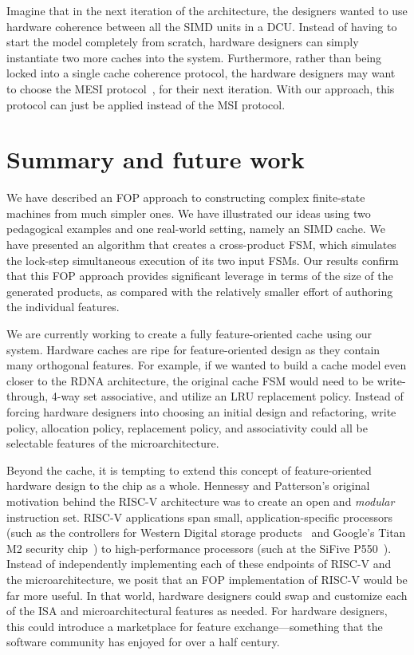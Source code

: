 \documentclass[sigplan,anonymous,review]{acmart}
\begin{document}
Imagine that in the next iteration of the architecture, the designers wanted to use hardware coherence between all the SIMD units in a DCU. Instead of having to start the model completely from scratch, hardware designers can simply instantiate two more caches into the system. Furthermore, rather than being locked into a single cache coherence protocol, the hardware designers may want to choose the MESI protocol~\cite{Papamarcos:84}, for their next iteration. With our approach, this protocol can just be applied instead of the MSI protocol. 

\section{Summary and future work}

We have described an FOP approach to constructing complex finite-state machines from much simpler ones.   We have illustrated our ideas using two pedagogical examples and one real-world setting, namely an SIMD cache.   We have presented an algorithm that creates a cross-product FSM, which simulates the lock-step simultaneous execution of its two input FSMs.  Our results confirm that this FOP approach provides significant leverage in terms of the size of the generated products, as compared with the relatively smaller effort of authoring the individual features.

We are currently working to create a fully feature-oriented cache using our system. Hardware caches are ripe for feature-oriented design as they contain many orthogonal features. For example, if we wanted to build a cache model even closer to the RDNA architecture, the original cache FSM would need to be write-through, 4-way set associative, and utilize an LRU replacement policy. Instead of forcing hardware designers into choosing an initial design and refactoring, write policy, allocation policy, replacement policy, and associativity could all be selectable features of the microarchitecture.

Beyond the cache, it is tempting to extend this concept of feature-oriented hardware design to the chip as a whole. Hennessy and Patterson's original motivation behind the RISC-V architecture was to create an open and \emph{modular} instruction set. RISC-V applications span small, application-specific processors (such as the controllers for Western Digital storage products~\cite{WD:22} and Google's Titan M2 security chip~\cite{kleidermacher:21}) to high-performance processors (such at the SiFive P550~\cite{SiFive:22}). Instead of independently implementing each of these endpoints of RISC-V and the microarchitecture, we posit that an FOP implementation of RISC-V would be far more useful. In that world, hardware designers could swap and customize each of the ISA and microarchitectural features as needed.  For hardware designers, this could introduce a marketplace for feature exchange---something that the software community has enjoyed for over a half century.



\end{document}
